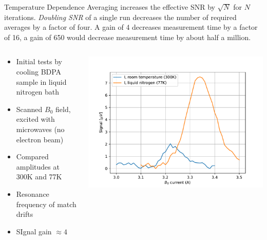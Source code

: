 \documentclass[final]{beamer}
\begin{document}
\begin{frame}[fragile]{}
\begin{columns}[T]
\begin{column}{.49\linewidth}
\begin{block}{\Large Temperature Dependence}
        Averaging increases the effective SNR by $\sqrt{N}$ for $N$ iterations. \textit{Doubling SNR}
        of a single run decreases the number of required averages by a factor of four. A gain
        of 4 decreases measurement time by a factor of 16, a gain of 650 would decrease
        measurement time by about half a million.

        \begin{columns}
          \begin{column}{0.65\columnwidth}
            \begin{itemize}
              \item Initial tests by cooling BDPA sample in liquid nitrogen bath
              \item Scanned $B_0$ field, excited with microwaves (no electron beam)
              \item Compared amplitudes at 300K and 77K
              \item Resonance frequency of match drifts
              \item SIgnal gain $\approx 4$
            \end{itemize}
          \end{column}
          \begin{column}{0.35\columnwidth}
            \includegraphics[width=\columnwidth]{figures/signals300_77.pdf}
          \end{column}
        \end{columns}
      \end{block}


\end{column}
\end{columns}
\end{frame}
\end{document}
